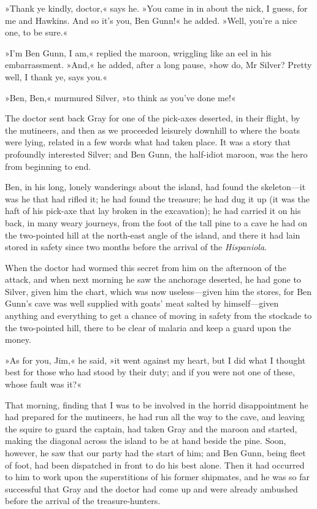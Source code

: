 »Thank ye kindly, doctor,« says he. »You came in in about the nick, I guess, for me and Hawkins. And so it's you, Ben Gunn!« he added. »Well, you're a nice one, to be sure.«

»I'm Ben Gunn, I am,« replied the maroon, wriggling like an eel in his embarrassment. »And,« he added, after a long pause, »how do, Mr Silver? Pretty well, I thank ye, says you.«

»Ben, Ben,« murmured Silver, »to think as you've done me!«

The doctor sent back Gray for one of the pick-axes deserted, in their flight, by the mutineers, and then as we proceeded leisurely downhill to where the boats were lying, related in a few words what had taken place. It was a story that profoundly interested Silver; and Ben Gunn, the half-idiot maroon, was the hero from beginning to end.

Ben, in his long, lonely wanderings about the island, had found the skeleton—it was he that had rifled it; he had found the treasure; he had dug it up (it was the haft of his pick-axe that lay broken in the excavation); he had carried it on his back, in many weary journeys, from the foot of the tall pine to a cave he had on the two-pointed hill at the north-east angle of the island, and there it had lain stored in safety since two months before the arrival of the \textit{Hispaniola}.

When the doctor had wormed this secret from him on the afternoon of the attack, and when next morning he saw the anchorage deserted, he had gone to Silver, given him the chart, which was now useless—given him the stores, for Ben Gunn's cave was well supplied with goats' meat salted by himself—given anything and everything to get a chance of moving in safety from the stockade to the two-pointed hill, there to be clear of malaria and keep a guard upon the money.

»As for you, Jim,« he said, »it went against my heart, but I did what I thought best for those who had stood by their duty; and if you were not one of these, whose fault was it?«

That morning, finding that I was to be involved in the horrid disappointment he had prepared for the mutineers, he had run all the way to the cave, and leaving the squire to guard the captain, had taken Gray and the maroon and started, making the diagonal across the island to be at hand beside the pine. Soon, however, he saw that our party had the start of him; and Ben Gunn, being fleet of foot, had been dispatched in front to do his best alone. Then it had occurred to him to work upon the superstitions of his former shipmates, and he was so far successful that Gray and the doctor had come up and were already ambushed before the arrival of the treasure-hunters.

